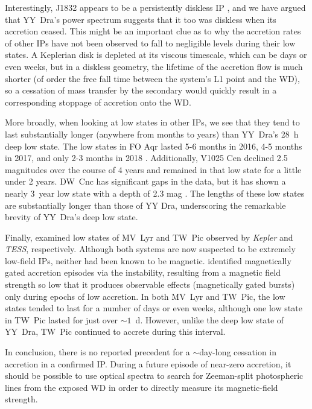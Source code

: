 \documentclass[twocolumn]{aastex63}
\newcommand{\TESS}{\textit{TESS}}
\begin{document}
Interestingly, J1832 appears to be a persistently diskless IP \citep{beuermann}, and we have argued that YY~Dra's power spectrum suggests that it too was diskless when its accretion ceased. This might be an important clue as to why the accretion rates of other IPs have not been observed to fall to negligible levels during their low states. A Keplerian disk is depleted at its viscous timescale, which can be days or even weeks, but in a diskless geometry, the lifetime of the accretion flow is much shorter (of order the free fall time between the system's L1 point and the WD), so a cessation of mass transfer by the secondary would quickly result in a corresponding stoppage of accretion onto the WD.

More broadly, when looking at low states in other IPs, we see that they tend to last substantially longer (anywhere from months to years) than YY~Dra's 28~h deep low state. The low states in FO Aqr lasted 5-6 months in 2016, 4-5 months in 2017, and only 2-3 months in 2018 \citep{Littlefield20}. Additionally, V1025 Cen \citep{covington, littlefield22} declined 2.5 magnitudes over the course of 4 years and remained in that low state for a little under 2 years. DW~Cnc has significant gaps in the data, but it has shown a nearly 3~year low state with a depth of 2.3 mag \citep{covington}. The lengths of these low states are substantially longer than those of YY Dra, underscoring the remarkable brevity of YY~Dra's deep low state.

Finally, \citet{scaringi17, scaringi21} examined low states of MV~Lyr and TW~Pic observed by \textit{Kepler} and \TESS, respectively. Although both systems are now suspected to be extremely low-field IPs, neither had been known to be magnetic. \citet{scaringi17, scaringi21} identified magnetically gated accretion episodes via the \citet{st93} instability, resulting from a magnetic field strength so low that it produces observable effects (magnetically gated bursts) only during epochs of low accretion. In both MV~Lyr and TW~Pic, the low states tended to last for a number of days or even weeks, although one low state in TW~Pic lasted for just over $\sim1$~d. However, unlike the deep low state of YY~Dra, TW~Pic continued to accrete during this interval.

In conclusion, there is no reported precedent for a $\sim$day-long cessation in accretion in a confirmed IP. During a future episode of near-zero accretion, it should be possible to use optical spectra to search for Zeeman-split photospheric lines from the exposed WD in order to directly measure its magnetic-field strength. 
\end{document}
